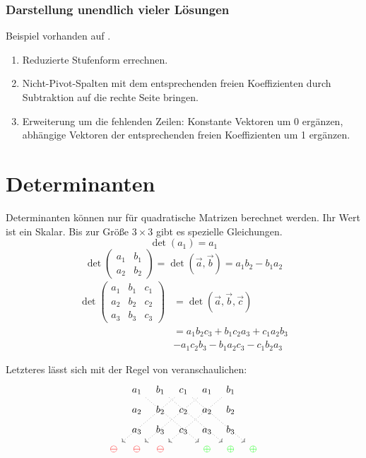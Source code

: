 \subsubsection{Darstellung unendlich vieler Lösungen}
\CheckedBox{} Beispiel vorhanden auf .

\begin{enumerate}
  \item Reduzierte Stufenform errechnen.
  \item Nicht-Pivot-Spalten mit dem entsprechenden freien Koeffizienten durch Subtraktion auf die rechte Seite bringen.
  \item Erweiterung um die fehlenden Zeilen: Konstante Vektoren um 0 er\-gänz\-en, abhängige Vektoren der entsprechenden freien Koeffizienten um 1 er\-gänz\-en.
\end{enumerate}


\section{Determinanten}

Determinanten können nur für quadratische Matrizen berechnet werden.
Ihr Wert ist ein Skalar.
Bis zur Größe $3\times3$ gibt es spezielle Gleichungen.
\[ \det(a_1)=a_1 \]
\[
	\det\begin{pmatrix}
	  a_1 & b_1\\
	  a_2 & b_2
	\end{pmatrix}
	=
	\det(\vec{a},\vec{b}) = a_1 b_2 - b_1 a_2
\]
\begin{align*}
\det\begin{pmatrix}
 a_1 & b_1 & c_1\\
 a_2 & b_2 & c_2\\
 a_3 & b_3 & c_3
\end{pmatrix}
& = \det(\vec{a},\vec{b},\vec{c}) \\
& = a_1 b_2 c_3 + b_1 c_2 a_3 + c_1 a_2 b_3 \\
& - a_1 c_2 b_3 - b_1 a_2 c_3 - c_1 b_2 a_3
\end{align*}

Letzteres lässt sich mit der Regel von  veranschaulichen:
\[
\begin{tikzcd}[sep=tiny]
        & a_1\arrow[dotted, rightarrow]{dddrrr} & b_1\arrow[dotted, rightarrow]{dddrrr} & c_1\arrow[dotted, rightarrow]{dddlll}\arrow[dotted, rightarrow]{dddrrr} & a_1\arrow[dotted, rightarrow]{dddlll} & b_1\arrow[dotted, rightarrow]{dddlll}\\
& a_2                 & b_2                 & c_2                                 & a_2                 & b_2\\
& a_3                 & b_3                 & c_3                                 & a_3                 & b_3\\
\color{red}\ominus & \color{red}\ominus & \color{red}\ominus & & \color{green}\oplus & \color{green}\oplus & \color{green}\oplus
\end{tikzcd}
\]

